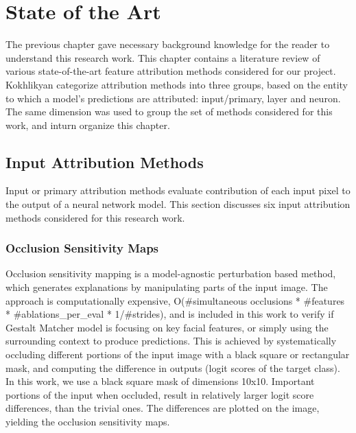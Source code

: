 \documentclass[../report.tex]{subfiles}
\begin{document}
    \chapter{State of the Art}
	The previous chapter gave necessary background knowledge for the reader to understand this research work. This chapter contains a literature review of various state-of-the-art feature attribution methods considered for our project. Kokhlikyan \etal \cite{kokhlikyan2020captum} categorize attribution methods into three groups, based on the entity to which a model's predictions are attributed: input/primary, layer and neuron. The same dimension was used to group the set of methods considered for this work, and inturn organize this chapter.
 
    \section{Input Attribution Methods}
    Input or primary attribution methods evaluate contribution of each input pixel to the output of a neural network model. This section discusses six input attribution methods considered for this research work.
    \subsection{Occlusion Sensitivity Maps}
    Occlusion sensitivity mapping \cite{matthew2014visualizing} is a model-agnostic perturbation based method, which generates explanations by manipulating parts of the input image. The approach is computationally expensive, O(\#simultaneous occlusions * \#features * \#ablations\_per\_eval * 1/\#strides), and is included in this work to verify if Gestalt Matcher model is focusing on key facial features, or simply using the surrounding context to produce predictions. This is achieved by systematically occluding different portions of the input image with a black square or rectangular mask, and computing the difference in outputs (logit scores of the target class). In this work, we use a  black square mask of dimensions 10x10. Important portions of the input when occluded, result in relatively larger logit score differences, than the trivial ones. The differences are plotted on the image, yielding the occlusion sensitivity maps.
    
\end{document}
